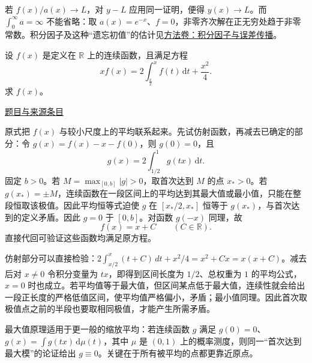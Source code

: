 \documentclass[UTF8,12pt,a4paper,fontset=fandol]{ctexart}
\begin{document}
\begin{remark}[方法与条件]若 $f(x)/a(x)\to L$，对 $y-L$ 应用同一证明，便得 $y(x)\to L$。而 $\int_0^\infty a=\infty$ 不能省略：取 $a(x)=e^{-x}$、$f=0$，非零齐次解在正无穷处趋于非零常数。积分因子及这种“遗忘初值”的估计见\hyperref[app:dynamics-factor]{方法卷：积分因子与误差传播}。\end{remark}

\begin{example}\label{ex:fin07-lo:9}\label{pr:fin07-lo:9}

设 $f(x)$ 是定义在 $\mathbb{R}$ 上的连续函数，且满足方程
\[
xf(x)=2\int_{\frac{x}{2}}^{x}f(t)\,\mathrm{d}t+\frac{x^{2}}{4}.
\]
求 $f(x)$。

\par\href{https://github.com/lzxcr/cmc-mathematics/blob/64916fa1fdbc3e444a652eca204d5669058ee321/src/problems/finals/07/10.md}{题目与来源条目}

\end{example}

\begin{solve}\label{ans:fin07-lo:9}

原式把 $f(x)$ 与较小尺度上的平均联系起来。先试仿射函数，再减去已确定的部分：令 $g(x)=f(x)-x-f(0)$，则 $g(0)=0$，且
\[
g(x)=2\int_{1/2}^1g(tx)\,\mathrm{d}t.
\]
固定 $b>0$。若 $M=\max_{[0,b]}|g|>0$，取首次达到 $M$ 的点 $x_*>0$。若 $g(x_*)=\pm M$，连续函数在一段区间上的平均达到其最大值或最小值，只能在整段恒取该极值。因此平均恒等式迫使 $g$ 在 $[x_*/2,x_*]$ 恒等于 $g(x_*)$，与首次达到的定义矛盾。因此 $g=0$ 于 $[0,b]$。对函数 $g(-x)$ 同理，故
\[
f(x)=x+C\qquad(C\in\mathbb R).
\]
直接代回可验证这些函数均满足原方程。

仿射部分可以直接检验：$2\int_{x/2}^x(t+C)\,dt+x^2/4=x^2+Cx=x(x+C)$。减去后对 $x\ne0$ 令积分变量为 $tx$，即得到区间长度为 $1/2$、总权重为 $1$ 的平均公式，$x=0$ 时也成立。若平均值等于最大值，但区间某点低于最大值，连续性就会给出一段正长度的严格低值区间，使平均值严格偏小，矛盾；最小值同理。因此首次取极值点之前的半段也要取相同极值，才能产生所需矛盾。

\end{solve}

\begin{remark}[方法与条件]最大值原理适用于更一般的缩放平均：若连续函数 $g$ 满足 $g(0)=0$、$g(x)=\int g(tx)\,\mathrm d\mu(t)$，其中 $\mu$ 是 $(0,1)$ 上的概率测度，则同一“首次达到最大模”的论证给出 $g\equiv0$。关键在于所有被平均的点都更靠近原点。\end{remark}
\end{document}
